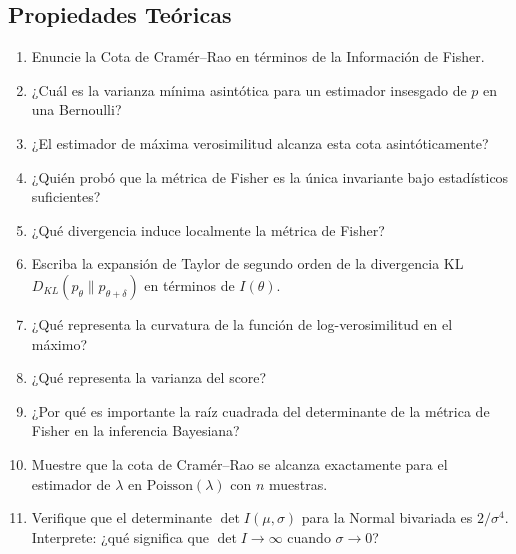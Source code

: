 \subsection*{Propiedades Teóricas}
\begin{enumerate}[resume]
	\item[$\star$] Enuncie la Cota de Cramér--Rao en términos de la Información de Fisher.
	\item[$\star$] ¿Cuál es la varianza mínima asintótica para un estimador insesgado de $p$ en una Bernoulli?
	\item[$\star$] ¿El estimador de máxima verosimilitud alcanza esta cota asintóticamente?
	\item[$\star$] ¿Quién probó que la métrica de Fisher es la única invariante bajo estadísticos suficientes?
	\item[$\star$] ¿Qué divergencia induce localmente la métrica de Fisher?
	\item[$\star\star$] Escriba la expansión de Taylor de segundo orden de la divergencia KL $D_{KL}(p_\theta \| p_{\theta+\delta})$ en términos de $I(\theta)$.
	\item[$\star\star$] ¿Qué representa la curvatura de la función de log-verosimilitud en el máximo?
	\item[$\star\star$] ¿Qué representa la varianza del score?
	\item[$\star\star\star$] ¿Por qué es importante la raíz cuadrada del determinante de la métrica de Fisher en la inferencia Bayesiana?
	\item[$\star\star\star$] Muestre que la cota de Cramér--Rao se alcanza exactamente para el estimador de $\lambda$ en $\mathrm{Poisson}(\lambda)$ con $n$ muestras.
	\item[$\star\star\star$] Verifique que el determinante $\det I(\mu, \sigma)$ para la Normal bivariada es $2/\sigma^4$. Interprete: ¿qué significa que $\det I \to \infty$ cuando $\sigma \to 0$?
\end{enumerate}

